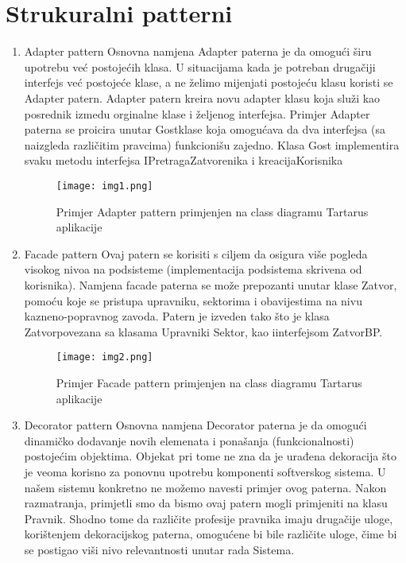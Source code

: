 \documentclass[12pt, a4paper]{report}
\theoremstyle{definition}
\begin{document}
\section *{Strukuralni patterni}
\begin{enumerate}

  \item  \large Adapter pattern \newline
  \normalsize
  Osnovna  namjena  Adapter  paterna  je  da omogući  širu  upotrebu  već postojećih  klasa.  U situacijama kada je potreban drugačiji interfejs već postojeće klase, a ne želimo mijenjati postojeću klasu koristi se Adapter patern. Adapter patern kreira novu adapter klasu koja služi kao posrednik izmedu orginalne klase i željenog interfejsa. Primjer Adapter paterna se proicira unutar Gostklase  koja  omogućava  da  dva  interfejsa  (sa  naizgleda  različitim  pravcima) funkcionišu zajedno. Klasa Gost implementira svaku metodu interfejsa IPretragaZatvorenika i kreacijaKorisnika
  \begin{figure}[h]
\centering
\texttt{[image: img1.png]}
\caption{Primjer Adapter pattern primjenjen na class diagramu Tartarus aplikacije}
\end{figure}
  \item \large Facade pattern \newline
  \normalsize
  Ovaj  patern  se  korisiti  s  ciljem  da  osigura  više  pogleda  visokog  nivoa  na  podsisteme (implementacija   podsistema   skrivena   od korisnika).   Namjena   facade  paterna  se  može prepozanti unutar klase Zatvor, pomoću koje se pristupa upravniku, sektorima i obavijestima na  nivu  kazneno-popravnog zavoda. Patern je izveden tako što je klasa Zatvorpovezana  sa klasama Upravniki Sektor, kao iinterfejsom ZatvorBP. 
    \begin{figure}[h]
\centering
\texttt{[image: img2.png]}
\caption{Primjer Facade pattern primjenjen na class diagramu Tartarus aplikacije}
\end{figure}
   \item \large Decorator pattern \newline
  \normalsize
  Osnovna namjena Decorator paterna je da omogući dinamičko dodavanje novih elemenata i ponašanja (funkcionalnosti) postojećim objektima. Objekat pri tome ne zna da je urađena dekoracija što je veoma korisno za ponovnu upotrebu komponenti softverskog sistema.  U našem  sistemu  konkretno  ne  možemo  navesti  primjer  ovog  paterna.  Nakon  razmatranja, primjetli smo da bismo ovaj patern mogli primjeniti na klasu Pravnik. Shodno tome da  različite profesije pravnika imaju drugačije uloge, korištenjem dekoracijskog paterna,  omogućene bi bile različite uloge, čime bi se postigao viši nivo relevantnosti unutar rada Sistema. 

\end{enumerate}
\end{document}
